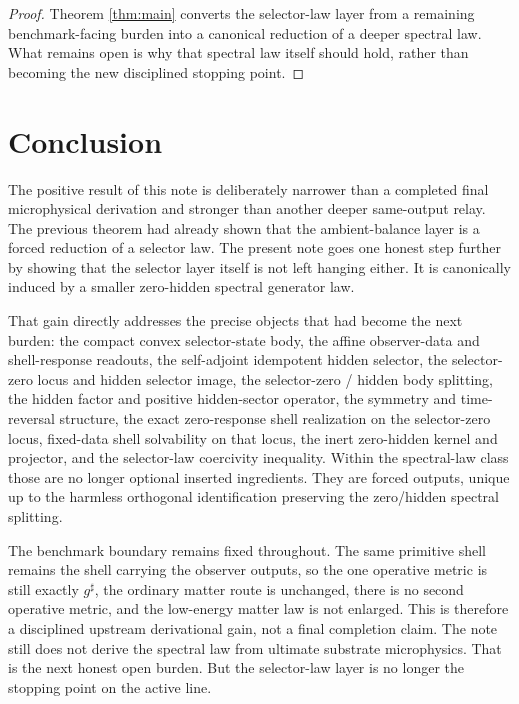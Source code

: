 \documentclass[11pt]{article}
\newcommand{\CompletedMetric}{g^{\sharp}}
\begin{document}
\begin{proof}
Theorem \ref{thm:main} converts the selector-law layer from a remaining benchmark-facing burden into a canonical reduction of a deeper spectral law. What remains open is why that spectral law itself should hold, rather than becoming the new disciplined stopping point.
\end{proof}

\section{Conclusion}

The positive result of this note is deliberately narrower than a completed final microphysical derivation and stronger than another deeper same-output relay. The previous theorem had already shown that the ambient-balance layer is a forced reduction of a selector law. The present note goes one honest step further by showing that the selector layer itself is not left hanging either. It is canonically induced by a smaller zero-hidden spectral generator law.

That gain directly addresses the precise objects that had become the next burden: the compact convex selector-state body, the affine observer-data and shell-response readouts, the self-adjoint idempotent hidden selector, the selector-zero locus and hidden selector image, the selector-zero / hidden body splitting, the hidden factor and positive hidden-sector operator, the symmetry and time-reversal structure, the exact zero-response shell realization on the selector-zero locus, fixed-data shell solvability on that locus, the inert zero-hidden kernel and projector, and the selector-law coercivity inequality. Within the spectral-law class those are no longer optional inserted ingredients. They are forced outputs, unique up to the harmless orthogonal identification preserving the zero/hidden spectral splitting.

The benchmark boundary remains fixed throughout. The same primitive shell remains the shell carrying the observer outputs, so the one operative metric is still exactly \(\CompletedMetric\), the ordinary matter route is unchanged, there is no second operative metric, and the low-energy matter law is not enlarged. This is therefore a disciplined upstream derivational gain, not a final completion claim. The note still does not derive the spectral law from ultimate substrate microphysics. That is the next honest open burden. But the selector-law layer is no longer the stopping point on the active line.
\end{document}
